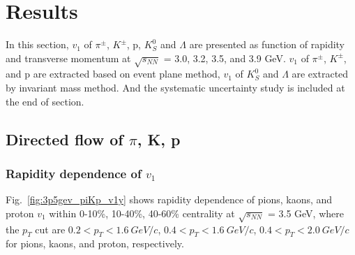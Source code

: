 \section{Results}

In this section, $v_1$ of $\pi^{\pm}$, $K^{\pm}$, p, $K^{0}_{S}$ and $\Lambda$ are presented as function of rapidity and transverse momentum at $\sqrt{s_{NN}}$ = 3.0, 3.2, 3.5, and 3.9 GeV.
$v_1$ of $\pi^{\pm}$, $K^{\pm}$, and p are extracted based on event plane method, $v_1$ of $K^{0}_{S}$ and $\Lambda$ are extracted by invariant mass method.
And the systematic uncertainty study is included at the end of section.

\subsection{Directed flow of $\pi$, K, p}

\subsubsection{Rapidity dependence of $v_1$}

Fig.~\ref{fig:3p5gev_piKp_v1y} shows rapidity dependence of pions, kaons, and proton $v_1$ within 0-10\%, 10-40\%, 40-60\% centrality at $\sqrt{s_{NN}}$ = 3.5 GeV,
where the $p_T$ cut are $0.2 < p_T < 1.6~GeV/c$, $0.4 < p_T < 1.6~GeV/c$, $0.4 < p_T < 2.0~GeV/c$ for pions, kaons, and proton, respectively. 


